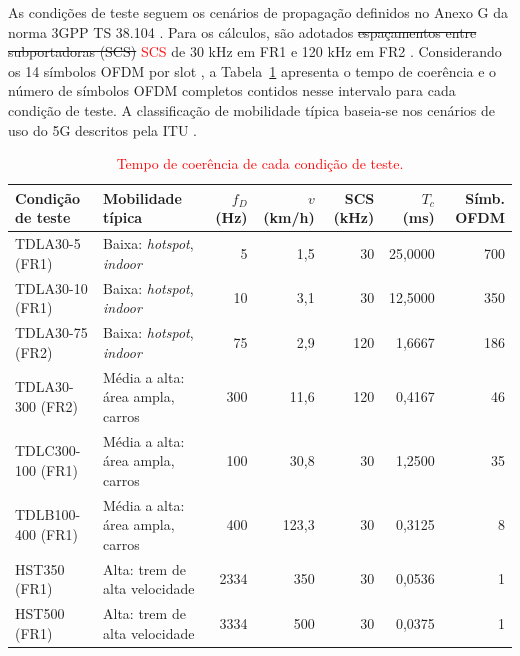 As condições de teste seguem os cenários de propagação definidos no Anexo G da norma 3GPP TS 38.104 \cite{3gpp-ts38104}. Para os cálculos, são adotados \sout{espaçamentos entre subportadoras (SCS)} \textcolor{red}{SCS} de 30 kHz em FR1 e 120 kHz em FR2 \cite[Tabs.~5.3.5-1 e 5.3.5-2]{3gpp-ts38104}. Considerando os 14 símbolos OFDM por slot \cite[Tab.~4.3.2-1]{3gpp-ts38211}, a Tabela~\ref{tab:tempo-coerencia} apresenta o tempo de coerência e o número de símbolos OFDM completos contidos nesse intervalo para cada condição de teste. A classificação de mobilidade típica baseia-se nos cenários de uso do 5G descritos pela ITU \cite[pp.~11, 14]{itu-m2083}.



\begin{table}[htbp]
\caption{\textcolor{red}{Tempo de coerência de cada condição de teste.}}
\label{tab:tempo-coerencia}
\centering
\footnotesize
\renewcommand{\arraystretch}{1.2}
\begin{tabular}{|l|p{4.2cm}|r|r|r|r|r|}
\hline
Condição de teste & \raggedright Mobilidade típica & $f_D$ (Hz) & $v$ (km/h) & SCS (kHz) & $T_c$ (ms) & Símb. OFDM \tabularnewline
\hline
TDLA30-5 (FR1) & \raggedright Baixa: \textit{hotspot}, \textit{indoor} & 5 & 1,5 & 30 & 25,0000 & 700 \tabularnewline
TDLA30-10 (FR1) & \raggedright Baixa: \textit{hotspot}, \textit{indoor} & 10 & 3,1 & 30 & 12,5000 & 350 \tabularnewline
TDLA30-75 (FR2) & \raggedright Baixa: \textit{hotspot}, \textit{indoor} & 75 & 2,9 & 120 & 1,6667 & 186 \tabularnewline
TDLA30-300 (FR2) & \raggedright Média a alta: área ampla, carros & 300 & 11,6 & 120 & 0,4167 & 46 \tabularnewline
TDLC300-100 (FR1) & \raggedright Média a alta: área ampla, carros & 100 & 30,8 & 30 & 1,2500 & 35 \tabularnewline
TDLB100-400 (FR1) & \raggedright Média a alta: área ampla, carros & 400 & 123,3 & 30 & 0,3125 & 8 \tabularnewline
HST350 (FR1) & \raggedright Alta: trem de alta velocidade & 2334 & 350 & 30 & 0,0536 & 1 \tabularnewline
HST500 (FR1) & \raggedright Alta: trem de alta velocidade & 3334 & 500 & 30 & 0,0375 & 1 \tabularnewline
\hline
\end{tabular}
\end{table}

